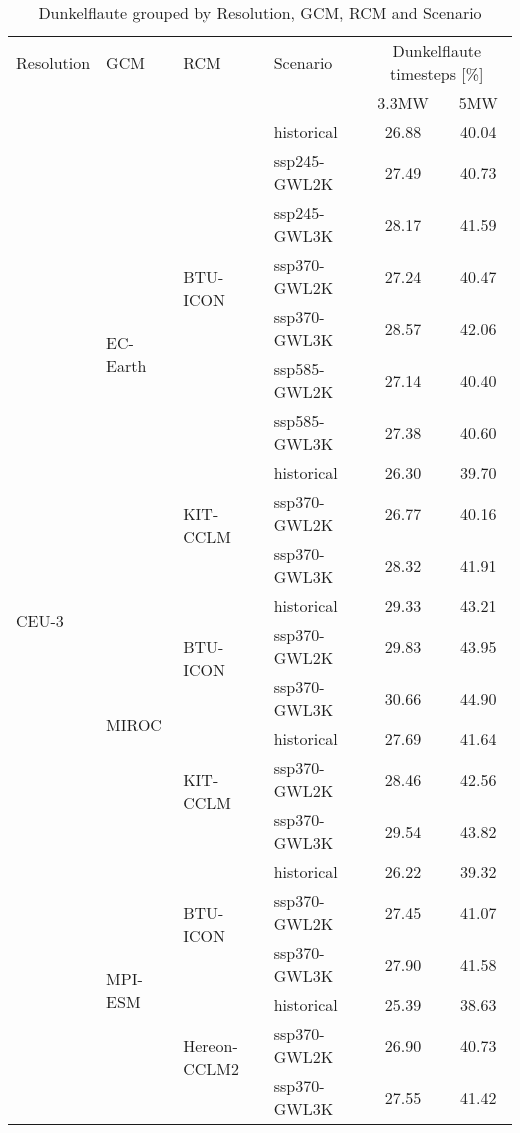\begin{table}[!htbp]
\centering
\footnotesize
\caption{Dunkelflaute grouped by Resolution, GCM, RCM and Scenario}
\label{Table:Dunkelflaute_changes}
\begin{tabular}{lll|l|cc}
\toprule
Resolution & GCM & RCM & Scenario & \multicolumn{2}{c}{Dunkelflaute timesteps [\%]} \\
 & & & & 3.3\si{\mega\watt} & 5\si{\mega\watt}  \\
\midrule
\multirow{22}{*}{CEU-3} & \multirow{10}{*}{EC-Earth} & \multirow{7}{*}{BTU-ICON} & historical & 26.88 & 40.04 \\
 &  &  & ssp245-GWL2K & 27.49 & 40.73 \\
 &  &  & ssp245-GWL3K & 28.17 & 41.59 \\
 &  &  & ssp370-GWL2K & 27.24 & 40.47 \\
 &  &  & ssp370-GWL3K & 28.57 & 42.06 \\
 &  &  & ssp585-GWL2K & 27.14 & 40.40 \\
 &  &  & ssp585-GWL3K & 27.38 & 40.60 \\
\cmidrule(lr){3-6}
 &  & \multirow{3}{*}{KIT-CCLM} & historical & 26.30 & 39.70 \\
 &  &  & ssp370-GWL2K & 26.77 & 40.16 \\
 &  &  & ssp370-GWL3K & 28.32 & 41.91 \\
\cmidrule(lr){3-6}
\cmidrule(lr){2-6}
 & \multirow{6}{*}{MIROC} & \multirow{3}{*}{BTU-ICON} & historical & 29.33 & 43.21 \\
 &  &  & ssp370-GWL2K & 29.83 & 43.95 \\
 &  &  & ssp370-GWL3K & 30.66 & 44.90 \\
\cmidrule(lr){3-6}
 &  & \multirow{3}{*}{KIT-CCLM} & historical & 27.69 & 41.64 \\
 &  &  & ssp370-GWL2K & 28.46 & 42.56 \\
 &  &  & ssp370-GWL3K & 29.54 & 43.82 \\
\cmidrule(lr){3-6}
\cmidrule(lr){2-6}
 & \multirow{6}{*}{MPI-ESM} & \multirow{3}{*}{BTU-ICON} & historical & 26.22 & 39.32 \\
 &  &  & ssp370-GWL2K & 27.45 & 41.07 \\
 &  &  & ssp370-GWL3K & 27.90 & 41.58 \\
\cmidrule(lr){3-6}
 &  & \multirow{3}{*}{Hereon-CCLM2} & historical & 25.39 & 38.63 \\
 &  &  & ssp370-GWL2K & 26.90 & 40.73 \\
 &  &  & ssp370-GWL3K & 27.55 & 41.42 \\

\end{tabular}
\end{table}
